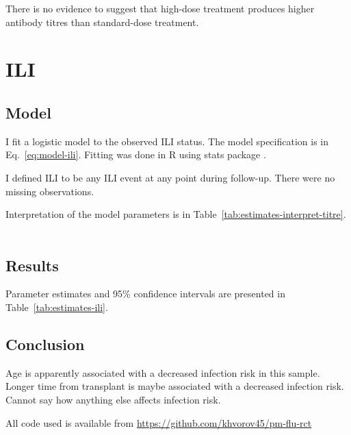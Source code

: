 \documentclass[11pt]{article}
\begin{document}
There is no evidence to suggest that high-dose treatment produces
higher antibody
titres than standard-dose treatment.

\section{ILI}

\subsection{Model}

I fit a logistic model to the observed ILI status.
The model specification is in Eq.~\ref{eq:model-ili}.
Fitting was done in R using stats package \cite{R}.

I defined ILI to be any ILI event at any point during follow-up. There were no
missing observations.

Interpretation of the model parameters is in
Table~\ref{tab:estimates-interpret-titre}.

\begin{equation}
    \begin{gathered}
        \label{eq:model-ili}
        
    \end{gathered}
\end{equation}





\subsection{Results}

Parameter estimates and 95\% confidence intervals
are presented in Table~\ref{tab:estimates-ili}.



\subsection{Conclusion}

Age is apparently associated with a decreased infection risk in this sample.
Longer time from transplant is maybe associated with a decreased infection risk.
Cannot say how anything else affects infection risk.



All code used is available from \url{https://github.com/khvorov45/pm-flu-rct}
\end{document}

